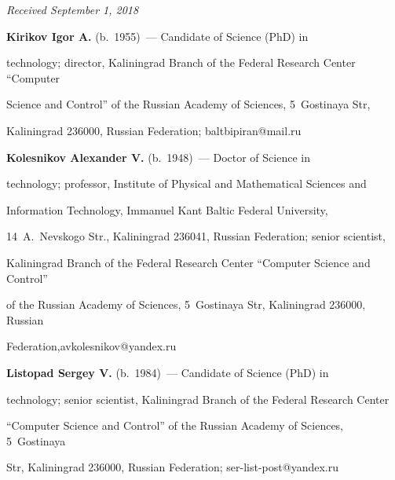 \vspace*{-3pt}





\hfill{\small\textit{Received September 1, 2018}} 


  


  


  \Contr


  


  \noindent


  \textbf{Kirikov Igor A.} (b.\ 1955)~--- Candidate of  Science (PhD) in 


technology; director, Kaliningrad Branch of the Federal Research Center ``Computer 


Science and Control'' of the Russian Academy of Sciences, 5~Gostinaya Str, 


Kaliningrad 236000, Russian Federation; \mbox{baltbipiran@mail.ru}


  


    \noindent


    \textbf{Kolesnikov Alexander V.} (b.\ 1948)~--- Doctor of Science in 


  technology; professor, Institute of Physical and Mathematical Sciences and 


  Information Technology, Immanuel Kant Baltic Federal University, 


  14~A.~Nevskogo Str., Kaliningrad 236041, Russian Federation; senior scientist, 


  Kaliningrad Branch of the Federal Research Center ``Computer Science and Control'' 


  of the Russian Academy of Sciences, 5~Gostinaya Str, Kaliningrad 236000, Russian 


  Federation,\linebreak \mbox{avkolesnikov@yandex.ru}


    


    \vspace*{5pt}


    


    \noindent


    \textbf{Listopad Sergey V.} (b.\ 1984)~--- Candidate of  Science (PhD) in 


  technology; senior scientist, Kaliningrad Branch of the Federal Research Center 


  ``Computer Science and Control'' of the Russian Academy of Sciences, 5~Gostinaya 


  Str, Kaliningrad 236000, Russian Federation; \mbox{ser-list-post@yandex.ru} 


\label{end\stat}








\renewcommand{\bibname}{\protect\rm Литература}


    


